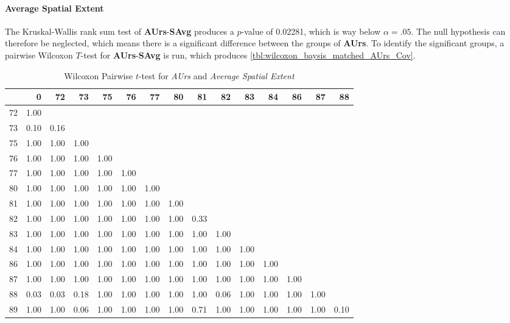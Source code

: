 \paragraph{Average Spatial Extent}
The Kruskal-Wallis rank sum test of \textbf{AUrs}-\textbf{SAvg} produces a $p$-value of 0.02281, which is way below $\alpha=.05$. The null hypothesis can therefore be neglected, which means there is a significant difference between the groups of \textbf{AUrs}. To identify the significant groups, a pairwise Wilcoxon $T$-test for \textbf{AUrs}-\textbf{SAvg} is run, which produces \autoref{tbl:wilcoxon_baysis_matched_AUrs_Cov}.
\begin{table}[ht]
	\small
	\centering
	\begin{tabular}{rrrrrrrrrrrrrrr}
		\toprule
		& 0 & 72 & 73 & 75 & 76 & 77 & 80 & 81 & 82 & 83 & 84 & 86 & 87 & 88 \\ 
		\midrule
		72 & 1.00 &  &  &  &  &  &  &  &  &  &  &  &  &  \\ 
		73 & 0.10 & 0.16 &  &  &  &  &  &  &  &  &  &  &  &  \\ 
		75 & 1.00 & 1.00 & 1.00 &  &  &  &  &  &  &  &  &  &  &  \\ 
		76 & 1.00 & 1.00 & 1.00 & 1.00 &  &  &  &  &  &  &  &  &  &  \\ 
		77 & 1.00 & 1.00 & 1.00 & 1.00 & 1.00 &  &  &  &  &  &  &  &  &  \\ 
		80 & 1.00 & 1.00 & 1.00 & 1.00 & 1.00 & 1.00 &  &  &  &  &  &  &  &  \\ 
		81 & 1.00 & 1.00 & 1.00 & 1.00 & 1.00 & 1.00 & 1.00 &  &  &  &  &  &  &  \\ 
		82 & 1.00 & 1.00 & 1.00 & 1.00 & 1.00 & 1.00 & 1.00 & 0.33 &  &  &  &  &  &  \\ 
		83 & 1.00 & 1.00 & 1.00 & 1.00 & 1.00 & 1.00 & 1.00 & 1.00 & 1.00 &  &  &  &  &  \\ 
		84 & 1.00 & 1.00 & 1.00 & 1.00 & 1.00 & 1.00 & 1.00 & 1.00 & 1.00 & 1.00 &  &  &  &  \\ 
		86 & 1.00 & 1.00 & 1.00 & 1.00 & 1.00 & 1.00 & 1.00 & 1.00 & 1.00 & 1.00 & 1.00 &  &  &  \\ 
		87 & 1.00 & 1.00 & 1.00 & 1.00 & 1.00 & 1.00 & 1.00 & 1.00 & 1.00 & 1.00 & 1.00 & 1.00 &  &  \\ 
		88 & 0.03 & 0.03 & 0.18 & 1.00 & 1.00 & 1.00 & 1.00 & 1.00 & 0.06 & 1.00 & 1.00 & 1.00 & 1.00 &  \\ 
		89 & 1.00 & 1.00 & 0.06 & 1.00 & 1.00 & 1.00 & 1.00 & 0.71 & 1.00 & 1.00 & 1.00 & 1.00 & 1.00 & 0.10 \\ 
		\bottomrule
	\end{tabular}
	\caption{Wilcoxon Pairwise $t$-test for \textit{AUrs} and \textit{Average Spatial Extent}}
	\label{tbl:wilcoxon_baysis_matched_AUrs_SAvg}
\end{table}
